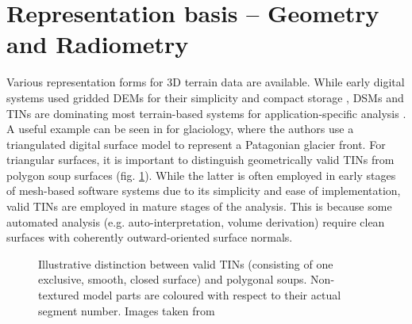 \documentclass[review]{elsarticle}
\begin{document}
\section{Representation basis -- Geometry and Radiometry}
\label{sec:representations}

Various representation forms for 3D terrain data are available. While early digital systems used gridded \glspl{DEM} for their simplicity and compact storage \cite{Trinks2005,McCaffrey2005}, \glspl{DSM} and \glspl{TIN} are dominating most terrain-based systems for application-specific analysis \cite{Buckley2008a,Caumon2013}. A useful example can be seen in \cite{Schwalbe2017b} for glaciology, where the authors use a  triangulated digital surface model to represent a Patagonian glacier front.
For triangular surfaces, it is important to distinguish geometrically valid \glspl{TIN} from polygon soup surfaces (fig. \ref{fig:representations:meshDistinction}). While the latter is often employed in early stages of mesh-based software systems due to its simplicity and ease of implementation, valid \glspl{TIN} are employed in mature stages of the analysis. This is because some automated analysis (e.g. auto-interpretation, volume derivation) require clean surfaces with coherently outward-oriented surface normals.

\begin{figure}[htbp]
\begin{center}
	 	\begin{minipage}{\columnwidth}
	 		\centering
	 	\end{minipage}
	\caption{Illustrative distinction between valid \glspl{TIN} (consisting of one exclusive, smooth, closed surface) and polygonal soups. Non-textured model parts are coloured with respect to their actual segment number. Images taken from \cite{Kehl2017_PhDThesis}}
	\label{fig:representations:meshDistinction}
\end{center}
\end{figure}
\end{document}
